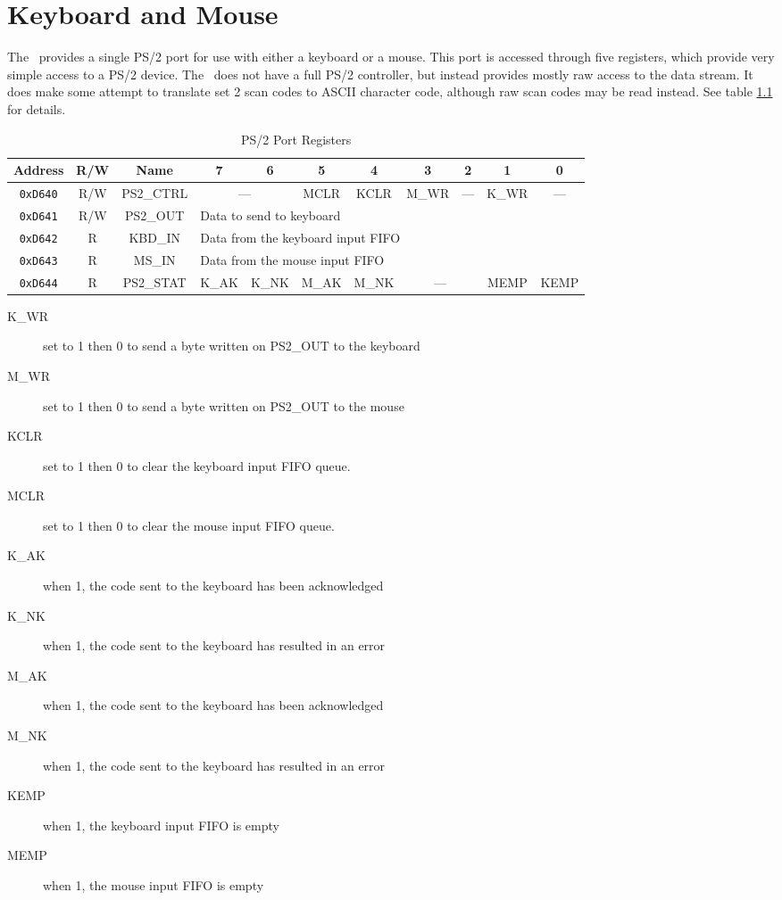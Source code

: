 \chapter{Keyboard and Mouse}

The \jr\ provides a single PS/2 port for use with either a keyboard or a mouse. This port is accessed through five registers, which provide very simple access to a PS/2 device. The \jr\ does not have a full PS/2 controller, but instead provides mostly raw access to the data stream. It does make some attempt to translate set 2 scan codes to ASCII character code, although raw scan codes may be read instead. See table \ref{tab:ps2_reg} for details.

\begin{table}[ht]
    \begin{center}
        \begin{tabular}{|c|c|c|c|c|c|c|c|c|c|c|} \hline
            Address & R/W & Name & 7 & 6 & 5 & 4 & 3 & 2 & 1 & 0 \\\hline\hline
            \verb+0xD640+ & R/W & PS2\_CTRL & \multicolumn{2}{|c|}{---} & MCLR & KCLR & M\_WR & --- & K\_WR & --- \\\hline
            \verb+0xD641+ & R/W & PS2\_OUT & \multicolumn{8}{|l|}{Data to send to keyboard} \\ \hline
            \verb+0xD642+ & R & KBD\_IN & \multicolumn{8}{|l|}{Data from the keyboard input FIFO} \\ \hline
            \verb+0xD643+ & R & MS\_IN & \multicolumn{8}{|l|}{Data from the mouse input FIFO} \\ \hline
            \verb+0xD644+ & R & PS2\_STAT & K\_AK & K\_NK & M\_AK & M\_NK & \multicolumn{2}{|c|}{---} & MEMP & KEMP \\ \hline
        \end{tabular}
    \end{center}
    \caption{PS/2 Port Registers}
    \label{tab:ps2_reg}
\end{table}

\begin{description}
    \item[K\_WR] set to 1 then 0 to send a byte written on PS2\_OUT to the keyboard
    \item[M\_WR] set to 1 then 0 to send a byte written on PS2\_OUT to the mouse
    \item[KCLR] set to 1 then 0 to clear the keyboard input FIFO queue.
    \item[MCLR] set to 1 then 0 to clear the mouse input FIFO queue. 
    \item[K\_AK] when 1, the code sent to the keyboard has been acknowledged
    \item[K\_NK] when 1, the code sent to the keyboard has resulted in an error
    \item[M\_AK] when 1, the code sent to the keyboard has been acknowledged
    \item[M\_NK] when 1, the code sent to the keyboard has resulted in an error
    \item[KEMP] when 1, the keyboard input FIFO is empty
    \item[MEMP] when 1, the mouse input FIFO is empty 
\end{description}

